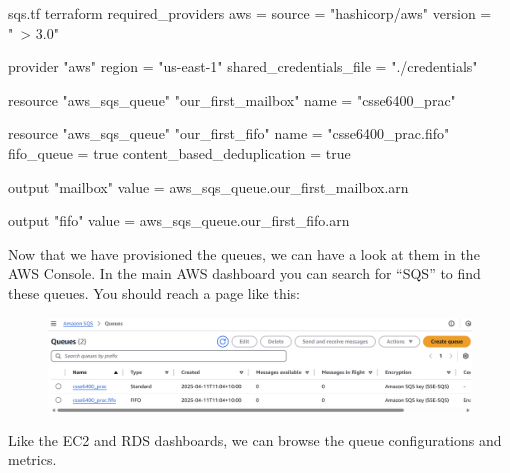 \documentclass{csse4400}
\begin{document}

\begin{code}[language=terraform, numbers=none]{sqs.tf}
terraform {
  required_providers {
    aws = {
      source = "hashicorp/aws"
      version = "~> 3.0"
    }
  }
}

provider "aws" {
  region = "us-east-1"
  shared_credentials_file = "./credentials"
}

resource "aws_sqs_queue" "our_first_mailbox" {
  name                        = "csse6400_prac"
}

resource "aws_sqs_queue" "our_first_fifo" {
  name                        = "csse6400_prac.fifo"
  fifo_queue                  = true
  content_based_deduplication = true
}

output "mailbox" {
  value = aws_sqs_queue.our_first_mailbox.arn
}

output "fifo" {
  value = aws_sqs_queue.our_first_fifo.arn
}
\end{code}

Now that we have provisioned the queues, we can have a look at them in the AWS Console.
In the main AWS dashboard you can search for ``SQS'' to find these queues.
You should reach a page like this:

\begin{figure}[H]
  \includegraphics[width=\textwidth]{images/sqspanel}
\end{figure}

Like the EC2 and RDS dashboards,
we can browse the queue configurations and metrics.
  
\end{document}
